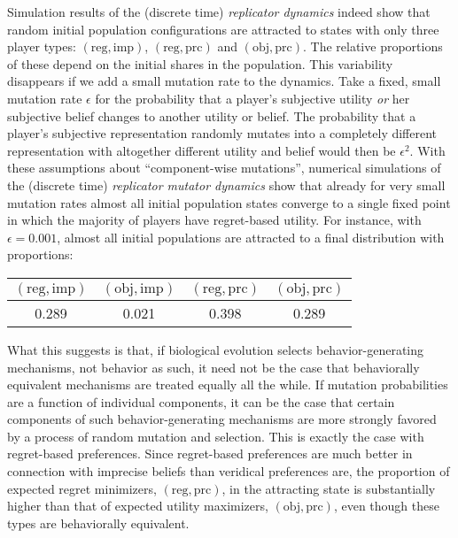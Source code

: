 \documentclass[fleqn,reqno,12pt]{article}
\theoremstyle{Satz}
\theoremstyle{Bsp}
\begin{document}
Simulation results of the (discrete time) \emph{replicator dynamics}
\citep{TaylorJonker1978:Evolutionary-St} indeed show that random initial population
configurations are attracted to states with only three player types:
$(\text{reg}, \text{imp})$, $(\text{reg}, \text{prc})$ and $(\text{obj}, \text{prc})$. The
relative proportions of these depend on the initial shares in the population. This variability disappears if
we add a small mutation rate to the dynamics. Take a fixed, small mutation rate $\epsilon$ for
the probability that a player's subjective utility \emph{or} her subjective belief changes to another
utility or belief. The probability that a player's subjective representation randomly mutates into a
completely different representation with altogether different utility and belief would
then be $\epsilon^2$. With these assumptions about ``component-wise mutations'', numerical
simulations of the (discrete time) \emph{replicator mutator dynamics}
\citep{Nowak2006:Evolutionary-Dy} show that already for very small mutation rates almost all
initial population states converge to a single fixed point in which the majority of players have
regret-based utility. For instance, with $\epsilon = 0.001$, almost all initial populations are
attracted to a final distribution with proportions:

\begin{center}
  \begin{tabular}{cccc}
    $(\text{reg}, \text{imp})$ & $(\text{obj}, \text{imp})$ & $(\text{reg},
      \text{prc})$ & $(\text{obj}, \text{prc})$ \\ \hline
    0.289  & 0.021 &   0.398 &    0.289 
  \end{tabular}
\end{center}

What this suggests is that, if biological evolution selects behavior-generating mechanisms, not
behavior as such, it need not be the case that behaviorally equivalent mechanisms are treated
equally all the while. If mutation probabilities are a function of individual components, it can be the case that
certain components of such behavior-generating mechanisms are more strongly favored by a process of random mutation and
selection. This is exactly the case with regret-based preferences. Since regret-based preferences are much better in connection with imprecise
beliefs than veridical preferences are, the proportion of expected regret minimizers,
$(\text{reg}, \text{prc})$, in the attracting state is substantially higher than that of
expected utility maximizers, $(\text{obj}, \text{prc})$, even though these types are
behaviorally equivalent.
\end{document}
